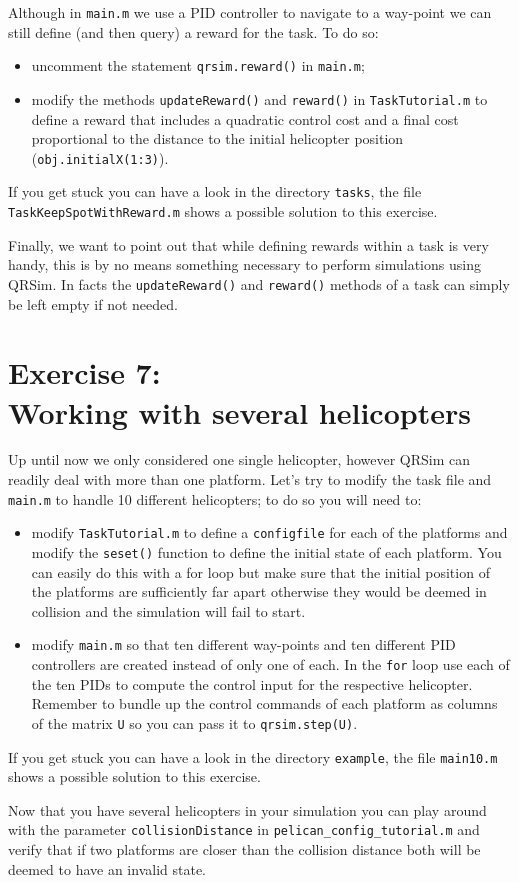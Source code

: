 \documentclass[a4paper,11pt]{article}
\begin{document}
Although in \texttt{main.m} we use a PID controller to navigate to a way-point we can still define (and then query) a reward for the task. To do so:
\begin{itemize}
 \item uncomment the statement \texttt{qrsim.reward()} in \texttt{main.m};
 \item modify the methods \texttt{updateReward()} and \texttt{reward()} in \texttt{TaskTutorial.m} to define a reward that includes a quadratic control cost and a final cost proportional to the distance to the initial helicopter position (\texttt{obj.initialX(1:3)}).
\end{itemize}
If you get stuck you can have a look in the directory \texttt{tasks}, the file \texttt{TaskKeepSpotWithReward.m} shows a possible solution to this exercise.

Finally, we want to point out that while defining rewards within a task is very handy, this is by no means something necessary to perform simulations using QRSim. In facts the \texttt{updateReward()} and \texttt{reward()} methods of a task can simply be left empty if not needed.

\section*{Exercise 7:\\Working with several helicopters}

Up until now we only considered one single helicopter, however QRSim can readily deal with more than one platform.
Let's try to modify the task file and \texttt{main.m} to handle 10 different helicopters; to do so you will need to:
\begin{itemize}
 \item modify \texttt{TaskTutorial.m} to define a \texttt{configfile} for each of the platforms and modify the \texttt{seset()} function to define the initial state of each platform. You can easily do this with a for loop but make sure that the initial position of the platforms are sufficiently far apart otherwise they would be deemed in collision and the simulation will fail to start.
\item modify \texttt{main.m} so that ten different way-points and ten different PID controllers are created instead of only one of each. In the \texttt{for} loop use each of the ten PIDs to compute the control input for the respective helicopter. Remember to bundle up the control commands of each platform as columns of the matrix \texttt{U} so you can pass it to \texttt{qrsim.step(U)}.
\end{itemize}
If you get stuck you can have a look in the directory \texttt{example}, the file \texttt{main10.m} shows a possible solution to this exercise.

Now that you have several helicopters in your simulation you can play around with the parameter \texttt{collisionDistance} in \texttt{pelican\_config\_tutorial.m} and verify that if two platforms are closer than the collision distance both will be deemed to have an invalid state.
\end{document}
